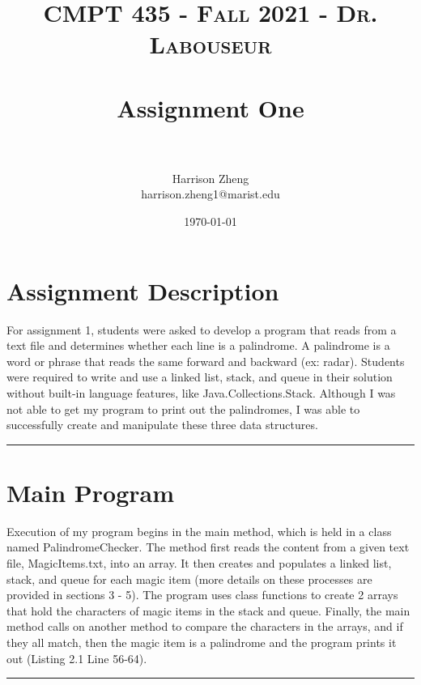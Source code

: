 \documentclass[letterpaper, 10pt,DIV=13]{scrartcl}
\title{	
   \normalfont \normalsize 
   \textsc{CMPT 435 - Fall 2021 - Dr. Labouseur} \\[10pt] %
   \horrule{0.5pt} \\[0.25cm] 	%
   \huge Assignment One  \\     	    %
   \horrule{0.5pt} \\[0.25cm] 	%
}
\author{Harrison Zheng \\ \normalsize harrison.zheng1@marist.edu}
\date{\normalsize\today} 	%
\numberwithin{equation}{section} %
\numberwithin{figure}{section} %
\numberwithin{table}{section} %
\newcommand{\horrule}[1]{\rule{\linewidth}{#1}} %
\begin{document}
\maketitle %


\section{Assignment Description}
For assignment 1, students were asked to develop a program that reads from a text file and determines whether each line is a palindrome. A palindrome is a word or phrase that reads the same forward and backward (ex: radar). Students were required to write and use a linked list, stack, and queue in their solution without built-in language features, like Java.Collections.Stack. Although I was not able to get my program to print out the palindromes, I was able to successfully create and manipulate these three data structures.

\horrule{0pt}  	%

\section{Main Program}
Execution of my program begins in the main method, which is held in a class named PalindromeChecker. The method first reads the content from a given text file,  MagicItems.txt, into an array. It then creates and populates a linked list, stack, and queue for each magic item (more details on these processes are provided in sections 3 - 5). The program uses class functions to create 2 arrays that hold the characters of magic items in the stack and queue. Finally, the main method calls on another method to compare the characters in the arrays, and if they all match, then the magic item is a palindrome and the program prints it out (Listing 2.1 Line 56-64). 

\horrule{0pt}  	%
\end{document}
